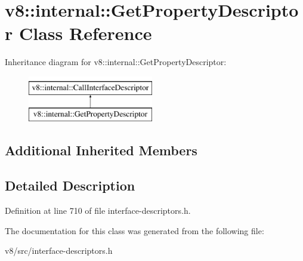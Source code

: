 \hypertarget{classv8_1_1internal_1_1GetPropertyDescriptor}{}\section{v8\+:\+:internal\+:\+:Get\+Property\+Descriptor Class Reference}
\label{classv8_1_1internal_1_1GetPropertyDescriptor}
Inheritance diagram for v8\+:\+:internal\+:\+:Get\+Property\+Descriptor\+:\begin{figure}[H]
\begin{center}
\leavevmode
\includegraphics[height=2.000000cm]{classv8_1_1internal_1_1GetPropertyDescriptor}
\end{center}
\end{figure}
\subsection*{Additional Inherited Members}


\subsection{Detailed Description}


Definition at line 710 of file interface-\/descriptors.\+h.



The documentation for this class was generated from the following file\+:\begin{DoxyCompactItemize}
\item 
v8/src/interface-\/descriptors.\+h\end{DoxyCompactItemize}
